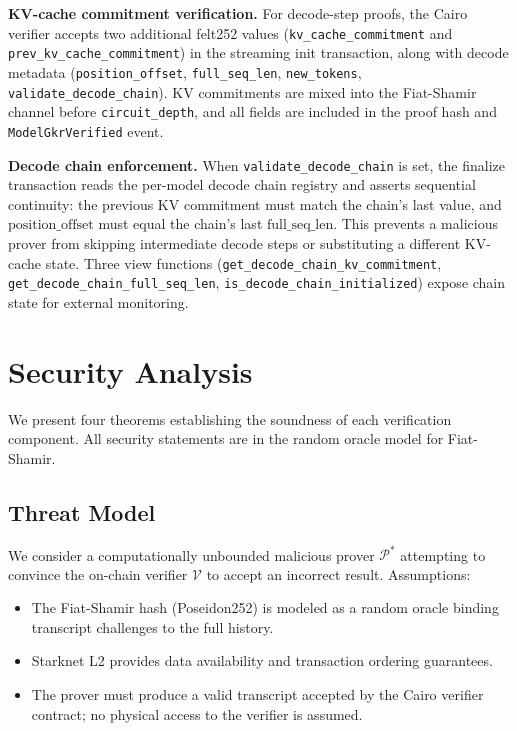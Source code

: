 \documentclass[10pt,twocolumn]{article}
\theoremstyle{definition}
\theoremstyle{remark}
\newcommand{\calP}{\mathcal{P}}
\newcommand{\calV}{\mathcal{V}}
\begin{document}
\textbf{KV-cache commitment verification.}
For decode-step proofs, the Cairo verifier accepts two additional
felt252 values (\texttt{kv\_cache\_commitment} and
\texttt{prev\_kv\_cache\_commitment}) in the streaming init
transaction, along with decode metadata
(\texttt{position\_offset}, \texttt{full\_seq\_len},
\texttt{new\_tokens}, \texttt{validate\_decode\_chain}).
KV commitments are mixed into the Fiat-Shamir channel before
\texttt{circuit\_depth}, and all fields are included in the
proof hash and \texttt{ModelGkrVerified} event.

\textbf{Decode chain enforcement.}
When \texttt{validate\_decode\_chain} is set, the finalize
transaction reads the per-model decode chain registry and
asserts sequential continuity: the previous KV commitment
must match the chain's last value, and
$\text{position\_offset}$ must equal the chain's last
$\text{full\_seq\_len}$.
This prevents a malicious prover from skipping intermediate
decode steps or substituting a different KV-cache state.
Three view functions (\texttt{get\_decode\_chain\_kv\_commitment},
\texttt{get\_decode\_chain\_full\_seq\_len},
\texttt{is\_decode\_chain\_initialized}) expose chain state
for external monitoring.


\section{Security Analysis}\label{sec:security}

We present four theorems establishing the soundness of each
verification component. All security statements are in the
random oracle model for Fiat-Shamir.

\subsection{Threat Model}

We consider a computationally unbounded malicious prover $\calP^*$
attempting to convince the on-chain verifier $\calV$ to accept an
incorrect result.
Assumptions:
\begin{itemize}[nosep,leftmargin=1.2em]
  \item The Fiat-Shamir hash (Poseidon252) is modeled as a random
        oracle binding transcript challenges to the full history.
  \item Starknet L2 provides data availability and transaction
        ordering guarantees.
  \item The prover must produce a valid transcript accepted by the
        Cairo verifier contract; no physical access to the verifier
        is assumed.
\end{itemize}
\end{document}
